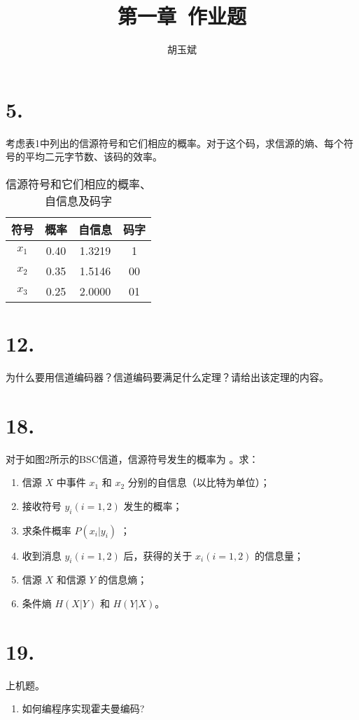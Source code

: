 \documentclass[onecolumn,oneside]{BUPTHomework}
\author{胡玉斌}
\title{第一章\ 作业题}
\begin{document}
  \maketitle
  
  \section*{5.}
  考虑表1中列出的信源符号和它们相应的概率。对于这个码，求信源的熵、每个符号的平均二元字节数、该码的效率。

  \begin{table}[!htbp]
  \centering
  \begin{tabular}{|c|c|c|c|}
  \hline
  符号    & 概率   & 自信息    & 码字 \\ \hline
  $x_1$ & 0.40 & 1.3219 & 1  \\ \hline
  $x_2$ & 0.35 & 1.5146 & 00 \\ \hline
  $x_3$ & 0.25 & 2.0000 & 01 \\ \hline
  \end{tabular}
  \caption{信源符号和它们相应的概率、自信息及码字}
  \end{table}

  \section*{12.}
  为什么要用信道编码器？信道编码要满足什么定理？请给出该定理的内容。

  \section*{18.}
  对于如图2所示的BSC信道，信源符号发生的概率为 。求：
  \begin{enumerate}
    \item 信源 $X$ 中事件 $x_1$ 和 $x_2$ 分别的自信息（以比特为单位）；
    \item 接收符号 $y_i(i=1,2)$ 发生的概率；
    \item 求条件概率 $P(x_i \vert y_i)$ ；
    \item 收到消息 $y_i(i=1,2)$ 后，获得的关于 $x_i(i=1,2)$ 的信息量；
    \item 信源 $X$ 和信源 $Y$ 的信息熵；
    \item 条件熵 $H(X \vert Y)$ 和 $H(Y \vert X)$。
  \end{enumerate}

  \section*{19.}
  上机题。
  \begin{enumerate}
    \item 如何编程序实现霍夫曼编码?
  \end{enumerate}
\end{document}
